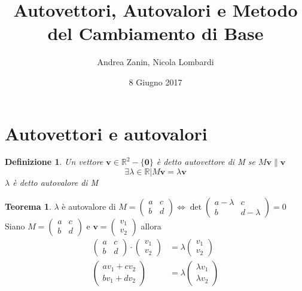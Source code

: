 \documentclass[10pt,a4paper]{article}
\author{Andrea Zanin, Nicola Lombardi}
\title{\textbf{Autovettori, Autovalori e Metodo del Cambiamento di Base}}
\date{8 Giugno 2017}
\theoremstyle{plain}
\newtheorem{definizione}[subsection]{Definizione}
\theoremstyle{definition}
\newtheorem{teorema}[subsection]{Teorema}
\begin{document}
\maketitle
\section{Autovettori e autovalori}
\begin{definizione}
	Un vettore $\mathbf{v} \in \mathbb{R}^2 -\{\mathbf{0}\}$ è detto autovettore di M se $M\mathbf{v}\parallel\mathbf{v}$ \\
	\[\exists \lambda \in \mathbb{R} \vert M\mathbf{v}=\lambda\mathbf{v}\]
	$\lambda$ è detto autovalore di M
\end{definizione}
\begin{teorema}$\lambda$ è autovalore di $M=\begin{pmatrix}
	a & c \\ b & d
	\end{pmatrix} \Leftrightarrow \det{\begin{pmatrix}
		a-\lambda & c \\ b & d-\lambda
		\end{pmatrix}}=0$ \\
Siano $
M=\begin{pmatrix}
a & c \\ b & d
\end{pmatrix}
$ e $\mathbf{v}=
\begin{pmatrix}
v_1 \\ v_2
\end{pmatrix}$ allora
\begin{align*}
	\begin{pmatrix}
	a & c \\ b & d
	\end{pmatrix}
	\cdot
	\begin{pmatrix}
	v_1 \\ v_2
	\end{pmatrix}
	&=
	\lambda
	\begin{pmatrix}
		v_1 \\ v_2
	\end{pmatrix}
	\\
	\begin{pmatrix}
	av_1 + cv_2 \\ bv_1 + dv_2
	\end{pmatrix}
	&=
	\lambda
	\begin{pmatrix}
	\lambda v_1 \\ \lambda v_2
	\end{pmatrix}

\end{align*}
\end{teorema}
\end{document}
